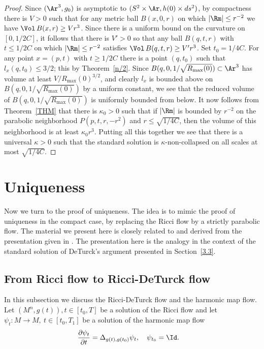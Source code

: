 \begin{proof}
Since  $(\Ar^3,g_0)$ is asymptotic to $(S^2\times \Ar,h(0)\times
ds^2)$, by compactness there is $V>0$ such that for any metric ball
$B(x,0,r)$ on which $|\Rm|\le r^{-2}$ we have $\Vol\,B(x,r)\ge V r^3$. Since there is a uniform bound on the
curvature on $[0,1/2C]$, it follows that there is $V'>0$ so that any
ball $B(q,t,r)$ with $t\le 1/2C$ on which $|\Rm|\le r^{-2}$
satisfies $\Vol\,B(q,t,r)\ge V'r^3$. Set $t_0=1/4C$. For any
point $x=(p,t)$ with $t\ge 1/2C$ there is a point $(q,t_0)$ such
that $l_x(q,t_0)\le 3/2$; this by Theorem~\ref{n/2}. Since
$B(q,0,1/\sqrt{R_{\max}(0)})\subset \Ar^3$ has volume at least
$V/R_{\max}(0)^{3/2}$, and clearly $l_x$ is bounded above on
$B(q,0,1/\sqrt{R_{\max}(0)})$ by a uniform constant, we see that
the reduced volume of $B(q,0,1/\sqrt{R_{\max}(0)})$ is uniformly
bounded from below. It now follows from Theorem~\ref{THM} that there
is $\kappa_0>0$ such that if $|\Rm|$ is bounded by $r^{-2}$ on
the parabolic neighborhood $P(p,t,r,-r^2)$ and $r\le \sqrt{1/4C}$,
then the volume of this neighborhood is at least $\kappa_0r^3$.
Putting all this together we see that there is a universal
$\kappa>0$ such that the standard solution is $\kappa$-non-collapsed
on all scales at most $\sqrt{1/4C}$.
\end{proof}

\section{Uniqueness}\label{12.4}

Now we turn to the proof of uniqueness. The idea is to mimic the
proof of uniqueness in the compact case, by replacing the Ricci flow
by a strictly parabolic flow. The material we present here is
closely related to and derived from the presentation given in
\cite{LuTian}. The presentation here is the analogy in the context
of the standard solution of DeTurck's argument presented in
Section~\ref{3.3}.

\subsection{From Ricci flow to Ricci-DeTurck flow}

In this subsection we discuss the Ricci-DeTurck flow and the
harmonic map flow. Let $(M^n,g(t)),t \in [t_0,T]$ be a solution of
the Ricci flow and let $\psi_{t}\colon M \rightarrow M,\ t \in
\left[ t_0,T_{1}\right]$ be a solution of the harmonic map
flow
\begin{align}
\frac{\partial\psi_{t}}{\partial t}  &  =\Delta_{g\left(  t\right)
,g(t_0) }\psi_{t},\label{eq2.1} \quad \psi_{t_0}  =\Id.
\end{align}

